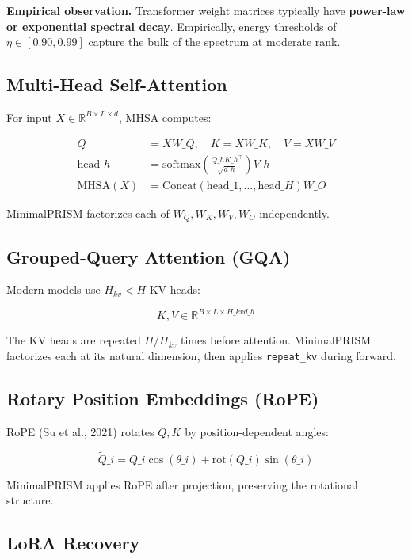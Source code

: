 \textbf{Empirical observation.} Transformer weight matrices typically have 
\textbf{power-law or exponential spectral decay}. Empirically, energy thresholds 
of $\eta \in [0.90, 0.99]$ capture the bulk of the spectrum at moderate rank.

\subsection{Multi-Head Self-Attention}

For input $X \in \mathbb{R}^{B \times L \times d}$, MHSA computes:

\[
\begin{aligned}
Q &= X W\_Q, \quad K = X W\_K, \quad V = X W\_V \\
\text{head}\_h &= \text{softmax}\!\left(\frac{Q\_h K\_h^\top}{\sqrt{d\_h}}\right) V\_h \\
\text{MHSA}(X) &= \text{Concat}(\text{head}\_1, \dots, \text{head}\_H) W\_O
\end{aligned}
\tag{3.7}
\]

MinimalPRISM factorizes each of $W_Q, W_K, W_V, W_O$ independently.

\subsection{Grouped-Query Attention (GQA)}

Modern models use $H_{kv} < H$ KV heads:

\[
K, V \in \mathbb{R}^{B \times L \times H\_{kv} d\_h}
\tag{3.8}
\]

The KV heads are repeated $H / H_{kv}$ times before attention. MinimalPRISM 
factorizes each at its natural dimension, then applies \texttt{repeat\_kv} during 
forward.

\subsection{Rotary Position Embeddings (RoPE)}

RoPE (Su et al., 2021) rotates $Q, K$ by position-dependent angles:

\[
\tilde{Q}\_i = Q\_i \cos(\theta\_i) + \text{rot}(Q\_i) \sin(\theta\_i)
\tag{3.9}
\]

MinimalPRISM applies RoPE after projection, preserving the rotational 
structure.

\subsection{LoRA Recovery}

